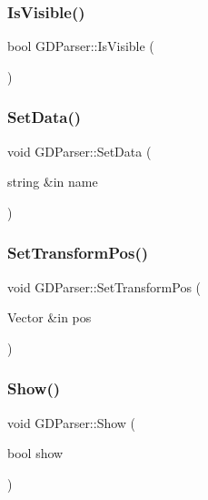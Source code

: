 \hypertarget{class_g_d_parser_aeafe6c609d594420bbbcbe7187a4c065}{}\label{class_g_d_parser_aeafe6c609d594420bbbcbe7187a4c065} 
\subsubsection{\texorpdfstring{Is\+Visible()}{IsVisible()}}
{\footnotesize\ttfamily bool G\+D\+Parser\+::\+Is\+Visible (\begin{DoxyParamCaption}{ }\end{DoxyParamCaption})}

\hypertarget{class_g_d_parser_a7a9ad8780a00456cc6e2cabb99fd6091}{}\label{class_g_d_parser_a7a9ad8780a00456cc6e2cabb99fd6091} 
\subsubsection{\texorpdfstring{Set\+Data()}{SetData()}}
{\footnotesize\ttfamily void G\+D\+Parser\+::\+Set\+Data (\begin{DoxyParamCaption}\item[{string \&in}]{name }\end{DoxyParamCaption})}

\hypertarget{class_g_d_parser_a8162fd1907d444488240ab1d8c3e7ec8}{}\label{class_g_d_parser_a8162fd1907d444488240ab1d8c3e7ec8} 
\subsubsection{\texorpdfstring{Set\+Transform\+Pos()}{SetTransformPos()}}
{\footnotesize\ttfamily void G\+D\+Parser\+::\+Set\+Transform\+Pos (\begin{DoxyParamCaption}\item[{Vector \&in}]{pos }\end{DoxyParamCaption})}

\hypertarget{class_g_d_parser_ad14f51ba67fa572b62d538b23cade1f4}{}\label{class_g_d_parser_ad14f51ba67fa572b62d538b23cade1f4} 
\subsubsection{\texorpdfstring{Show()}{Show()}}
{\footnotesize\ttfamily void G\+D\+Parser\+::\+Show (\begin{DoxyParamCaption}\item[{bool}]{show }\end{DoxyParamCaption})}

